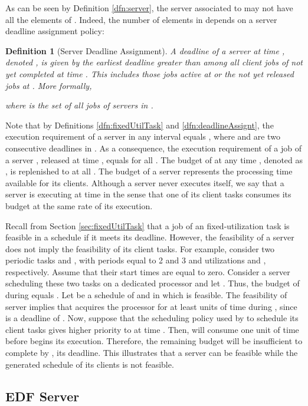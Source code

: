 \documentclass[twocolumn, compsocconf]{IEEEtran}
\newtheorem{definition}{Definition}[section]
\newcounter{proc}
\begin{document}
As can be seen by Definition \ref{dfn:server}, the server  associated to
 may not have all the elements of . Indeed, the number of elements in  depends on a
server deadline assignment policy:

\begin{definition}[Server Deadline Assignment\label{dfn:deadlineAssignt}]
  A deadline of a server  at time , denoted , is given by
  the earliest deadline greater than  among all client jobs of  not yet
  completed at time . This includes those jobs active at  or the not yet
  released jobs at . More formally,
  
  where  is the set of all jobs of servers in .
\end{definition}

Note that by Definitions \ref{dfn:fixedUtilTask} and \ref{dfn:deadlineAssignt},
the execution requirement of a server  in any interval  equals
, where  and  are two consecutive deadlines in
. As a consequence, the execution requirement of a job  of a
server , released at time , equals  for all . The budget of  at any
time , denoted as , is replenished to  at all . The budget of a server represents the processing time available for
its clients. Although a server never executes itself, we say that a server 
is executing at time  in the sense that one of its client tasks consumes
its budget  at the same rate of its execution.

Recall from Section \ref{sec:fixedUtilTask} that a job of an fixed-utilization
task is feasible in a schedule  if it meets its deadline. However, the
feasibility of a server does not imply the feasibility of its client tasks. For
example, consider two periodic tasks  and
, with periods equal to 2 and 3 and
utilizations  and , respectively. Assume
that their start times are equal to zero. Consider a server  scheduling these
two tasks on a dedicated processor and let . Thus, the budget of  during  equals . Let  be a schedule of  and  in which  is
feasible.  The feasibility of server  implies that  acquires the processor
for at least  units of time during , since  is a deadline of
. Now, suppose that the scheduling policy used by  to schedule its client
tasks gives higher priority to  at time .  Then,  will
consume one unit of time before  begins its execution. Therefore, the
remaining budget  will be insufficient to complete  by
, its deadline. This illustrates that a server can be feasible while the
generated schedule of its clients is not feasible.


\subsection{EDF Server}
\label{sec:predictability}
\end{document}

